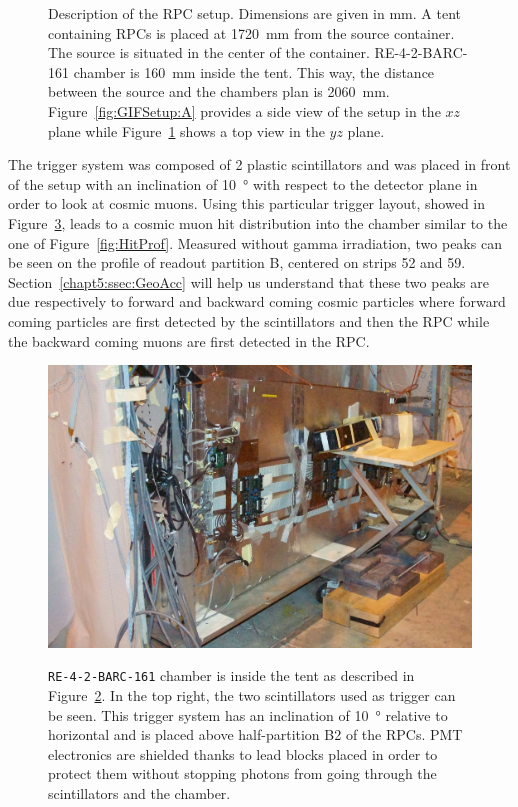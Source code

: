 \begin{figure}[H]
\begin{subfigure}{0.5\linewidth}
			\caption{\label{fig:GIFSetup:B}}
		\end{subfigure}
		\caption{\label{fig:GIFSetup} Description of the RPC setup. Dimensions are given in \si{mm}. A tent containing RPCs is placed at \SI{1720}{mm} from the source container. The source is situated in the center of the container. RE-4-2-BARC-161 chamber is \SI{160}{mm} inside the tent. This way, the distance between the source and the chambers plan is \SI{2060}{mm}. Figure~\ref{fig:GIFSetup:A} provides a side view of the setup in the $xz$ plane while Figure~\ref{fig:GIFSetup:B} shows a top view in the $yz$ plane.}
	\end{figure}
	
	The trigger system was composed of 2 plastic scintillators and was placed in front of the setup with an inclination of \SI{10}{\degree} with respect to the detector plane in order to look at cosmic muons. Using this particular trigger layout, showed in Figure~\ref{fig:GIF-RPCSetup}, leads to a cosmic muon hit distribution into the chamber similar to the one of Figure~\ref{fig:HitProf}. Measured without gamma irradiation, two peaks can be seen on the profile of readout partition B, centered on strips 52 and 59. Section~\ref{chapt5:ssec:GeoAcc} will help us understand that these two peaks are due respectively to forward and backward coming cosmic particles where forward coming particles are first detected by the scintillators and then the RPC while the backward coming muons are first detected in the RPC.

	\begin{figure}[H]
		\centering
		\includegraphics[width = 0.8\plotwidth]{fig/chapt5/GIF-RPCSetup.jpg}\\
		\caption{\label{fig:GIF-RPCSetup} \texttt{RE-4-2-BARC-161} chamber is inside the tent as described in Figure~\ref{fig:GIFSetup}. In the top right, the two scintillators used as trigger can be seen. This trigger system has an inclination of \SI{10}{\degree} relative to horizontal and is placed above half-partition B2 of the RPCs. PMT electronics are shielded thanks to lead blocks placed in order to protect them without stopping photons from going through the scintillators and the chamber.}
	\end{figure}

